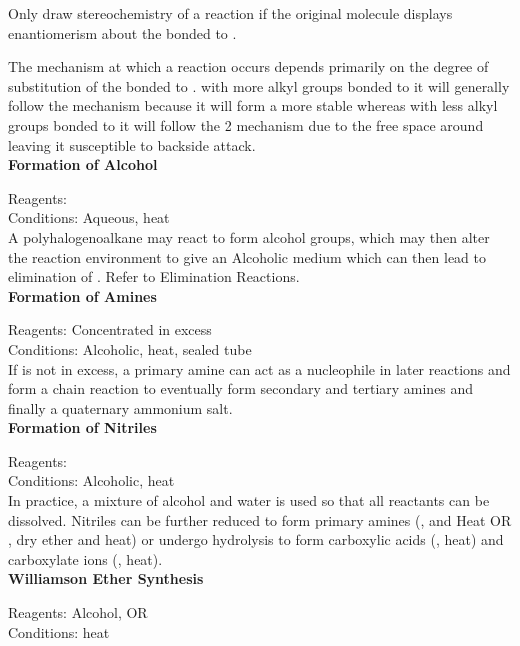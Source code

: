 \documentclass[../main]{subfiles}
\begin{document}
	Only draw stereochemistry of a reaction if the original molecule displays enantiomerism about the  bonded to .

	The mechanism at which a  reaction occurs depends primarily on the degree of substitution of the  bonded to .  with more alkyl groups bonded to it will generally follow the  mechanism because it will form a more stable  whereas  with less alkyl groups bonded to it will follow the 2 mechanism due to the free space around  leaving it susceptible to backside attack. \\

	\noindent \textbf{Formation of Alcohol}

	Reagents:  \\
	Conditions: Aqueous, heat \\

	A polyhalogenoalkane may react to form alcohol groups, which may then alter the reaction environment to give an Alcoholic medium which can then lead to elimination of . Refer to Elimination Reactions. \\

	\noindent \textbf{Formation of Amines}

	Reagents: Concentrated  in excess \\
	Conditions: Alcoholic, heat, sealed tube \\

	If  is not in excess, a primary amine can act as a nucleophile in later reactions and form a chain reaction to eventually form secondary and tertiary amines and finally a quaternary ammonium salt. \\

	\noindent \textbf{Formation of Nitriles}

	Reagents:  \\
	Conditions: Alcoholic, heat \\

	In practice, a mixture of alcohol and water is used so that all reactants can be dissolved. Nitriles can be further reduced to form primary amines (,  and Heat OR , dry ether and heat) or undergo hydrolysis to form carboxylic acids (, heat) and carboxylate ions (, heat). \\

	\noindent \textbf{Williamson Ether Synthesis}

	Reagents: Alcohol,  OR \\
	Conditions: heat \\
\end{document}
